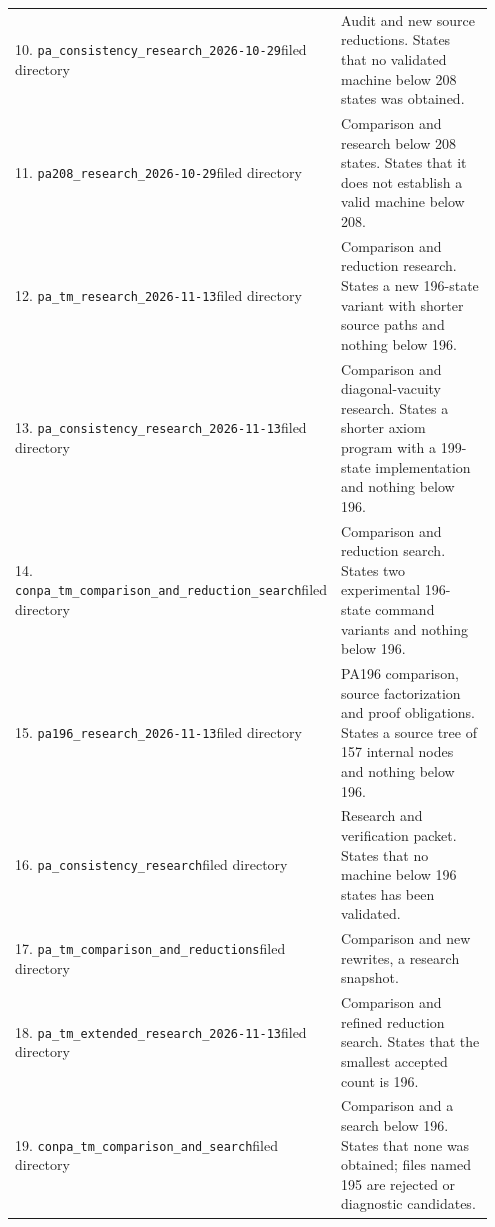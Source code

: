 \begin{longtable}{@{}p{0.43\linewidth}p{0.52\linewidth}@{}}
10. \nolinkurl{pa_consistency_research_2026-10-29}\newline filed directory&Audit and new source reductions. States that no validated machine below 208 states was obtained.\\[5pt]
11. \nolinkurl{pa208_research_2026-10-29}\newline filed directory&Comparison and research below 208 states. States that it does not establish a valid machine below 208.\\[5pt]
12. \nolinkurl{pa_tm_research_2026-11-13}\newline filed directory&Comparison and reduction research. States a new 196-state variant with shorter source paths and nothing below 196.\\[5pt]
13. \nolinkurl{pa_consistency_research_2026-11-13}\newline filed directory&Comparison and diagonal-vacuity research. States a shorter axiom program with a 199-state implementation and nothing below 196.\\[5pt]
14. \nolinkurl{conpa_tm_comparison_and_reduction_search}\newline filed directory&Comparison and reduction search. States two experimental 196-state command variants and nothing below 196.\\[5pt]
15. \nolinkurl{pa196_research_2026-11-13}\newline filed directory&PA196 comparison, source factorization and proof obligations. States a source tree of 157 internal nodes and nothing below 196.\\[5pt]
16. \nolinkurl{pa_consistency_research}\newline filed directory&Research and verification packet. States that no machine below 196 states has been validated.\\[5pt]
17. \nolinkurl{pa_tm_comparison_and_reductions}\newline filed directory&Comparison and new rewrites, a research snapshot.\\[5pt]
18. \nolinkurl{pa_tm_extended_research_2026-11-13}\newline filed directory&Comparison and refined reduction search. States that the smallest accepted count is 196.\\[5pt]
19. \nolinkurl{conpa_tm_comparison_and_search}\newline filed directory&Comparison and a search below 196. States that none was obtained; files named 195 are rejected or diagnostic candidates.\\[5pt]

\end{longtable}
